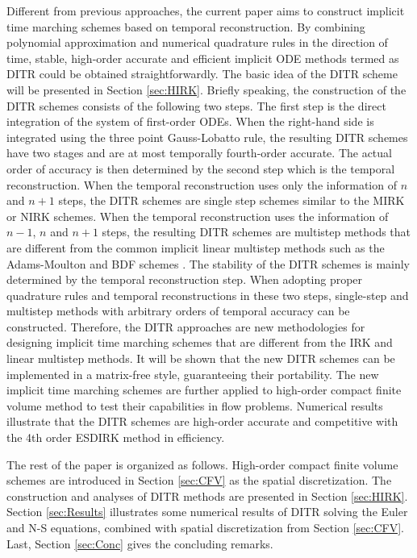 Different from previous approaches,
the current paper aims to construct implicit
time marching schemes based on temporal
reconstruction.
By combining polynomial approximation and
numerical quadrature rules in the direction of time,
stable,
high-order accurate and efficient implicit ODE methods
termed as DITR could be
obtained straightforwardly.
The basic idea of the DITR scheme will be presented
in Section \ref{sec:HIRK}.
Briefly speaking, the construction of the DITR
schemes consists of the following two steps.
The first step is the direct integration of the
system of first-order ODEs.
When the right-hand side is integrated using the
three point Gauss-Lobatto rule, the resulting DITR
schemes have two stages and are at most temporally fourth-order accurate.
The actual order of accuracy is then determined by
the second step which is the temporal reconstruction.
When the temporal reconstruction uses only the information of $n$
and $n+1$ steps, the DITR schemes are single step schemes
similar to the MIRK or NIRK schemes.
When the temporal reconstruction uses the information of $n-1$, $n$ and $n+1$ steps,
the resulting DITR schemes are multistep methods that are
different from the common implicit linear multistep
methods such as
the Adams-Moulton and BDF schemes \cite{wanner1996solving}.
The stability of the DITR
schemes is mainly determined by the temporal
reconstruction step.
When adopting proper quadrature rules
and temporal reconstructions in these two steps, single-step
and multistep methods with arbitrary orders of temporal
accuracy can be constructed. Therefore, the DITR approaches
are new methodologies for designing implicit time marching
schemes that are different from the IRK and linear multistep
methods.
It will be shown that the new DITR schemes can be implemented
in a matrix-free style, guaranteeing their portability.
The new implicit time marching schemes are further applied to
high-order compact finite volume method to
test their capabilities in flow problems. 
Numerical results
illustrate that the DITR schemes are high-order accurate
and competitive with the 4th order ESDIRK method in efficiency.


The rest of the paper is organized as follows.
High-order compact finite volume schemes
are introduced in Section \ref{sec:CFV} as the spatial discretization.
The construction and analyses of DITR methods are presented
in Section \ref{sec:HIRK}.
Section \ref{sec:Results} illustrates some numerical results of
DITR solving the Euler and N-S equations, combined with
spatial  discretization from Section \ref{sec:CFV}.
Last, Section \ref{sec:Conc} gives the concluding remarks.


